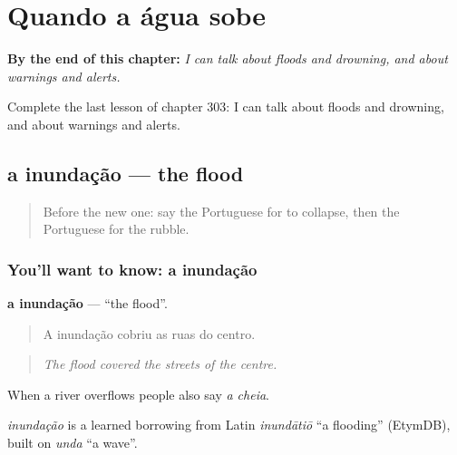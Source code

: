 
\chapter{Quando a água sobe}
\label{ch:pt-quando-a-agua-sobe}

\begin{chapteropening}
\textbf{By the end of this chapter:} \emph{I can talk about floods and drowning, and about warnings and alerts.}

Complete the last lesson of chapter 303: I can talk about floods and drowning, and about warnings and alerts.
\end{chapteropening}

\section[a inundação]{a inundação — the flood}

\label{lesson:PT-C303-inundacao}



\begin{quote}
Before the new one: say the Portuguese for to collapse, then the Portuguese for the rubble.
\end{quote}

\subsection*{You'll want to know: a inundação}
\textbf{a inundação} — \textquotedblleft{}the flood\textquotedblright{}.

\begin{quote}
A inundação cobriu as ruas do centro.
\end{quote}

\begin{quote}
\emph{The flood covered the streets of the centre.}
\end{quote}

When a river overflows people also say \emph{a cheia}.

\begin{cousinweb}
\emph{inundação} is a learned borrowing from Latin \emph{inundātiō} \textquotedblleft{}a flooding\textquotedblright{} (EtymDB), built on \emph{unda} \textquotedblleft{}a wave\textquotedblright{}.
\end{cousinweb}


